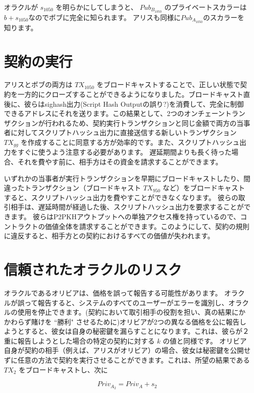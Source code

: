 \documentclass[11pt]{article}
\begin{document}
オラクルが \(s_{1050}\) を明らかにしてしまうと、 \(Pub_{B_{1050}}\) のプライベートスカラーは \(b + s_{1050}\)なのでボブに完全に知られます。 アリスも同様に\(Pub_{A_{1050}}\)のスカラーを知ります。

\section*{契約の実行}

アリスとボブの両方は \(TX_{1050}\) をブロードキャストすることで、正しい状態で契約を一方的にクローズすることができるようになりました。ブロードキャスト直後に、彼らはsighash出力(Script Hash Outputの誤り?)を消費して、完全に制御できるアドレスにそれを送ります。この結果として、2つのオンチェーントランザクションが行われるため、契約実行トランザクションと同じ金額で両方の当事者に対してスクリプトハッシュ出力に直接送信する新しいトランザクション \(TX_{gg}\) を作成することに同意する方が効率的です。また、スクリプトハッシュ出力をすぐに使うよう注意する必要があります。 遅延期間よりも長く待った場合、それを費やす前に、相手方はその資金を請求することができます。

いずれかの当事者が実行トランザクションを早期にブロードキャストしたり、間違ったトランザクション（ブロードキャスト \(TX_{950}\) など）をブロードキャストすると、スクリプトハッシュ出力を費やすことができなくなります。 彼らの取引相手は、遅延時間が経過した後、スクリプトハッシュ出力を要求することができます。 彼らはP2PKHアウトプットへの単独アクセス権を持っているので、コントラクトの価値全体を請求することができます。このようにして、契約の規則に違反すると、相手方との契約におけるすべての価値が失われます。

\section*{信頼されたオラクルのリスク}

オラクルであるオリビアは、価格を誤って報告する可能性があります。 オラクルが誤って報告すると、システムのすべてのユーザーがエラーを識別し、オラクルの使用を停止できます。(契約において取引相手の役割を担い、真の結果にかかわらず賭けを ``勝利" させるために)オリビアが2つの異なる価格を公に報告しようとすると、彼女は自身の秘密鍵を漏らすことになります。これは、彼らが２重に報告しようとした場合の特定の契約に対する \(k\) の値と同様です。
オリビア自身が契約の相手（例えば、アリスがオリビア）の場合、彼女は秘密鍵を公開せずに任意の方法で契約を実行させることができます。これは、所望の結果である \(TX_{2}\) をブロードキャストし、次に

\[Priv_{A_2} =  Priv_{A} + s_{2}\]
\end{document}
